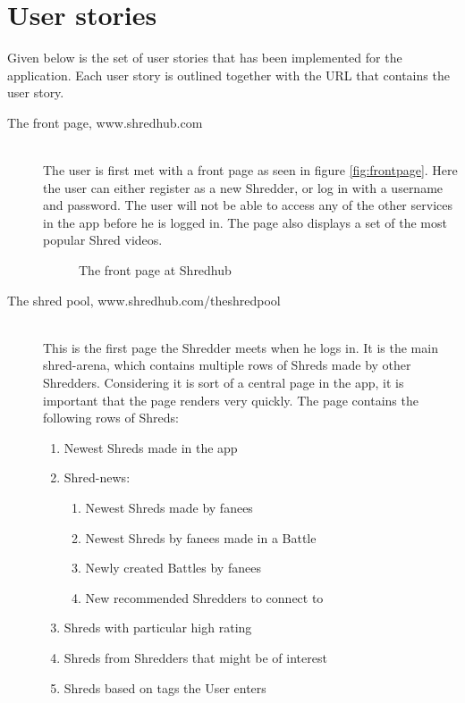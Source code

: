 \section{User stories}
Given below is the set of user stories that has been implemented for the application. Each user story is outlined together with the URL that contains the user story. 
\begin{description}
		
\item[The front page, www.shredhub.com] \hfill \\
The user is first met with a front page as seen in figure \vref{fig:frontpage}. Here the user can either register as a new Shredder, or log in with a username and password. The user will not be able to access any of the other services in the app before he is logged in. The page also displays a set of the most popular Shred videos.
\begin{figure}
 \begin{center}
\end{center}
\caption{The front page at Shredhub}\label{fig:frontpage}
\end{figure}

\item [The shred pool, www.shredhub.com/theshredpool] \hfill \\
This is the first page the Shredder meets when he logs in. It is the main shred-arena, which contains multiple rows of Shreds made by other Shredders. Considering it is sort of a central page in the app, it is important that the page renders very quickly. The page contains the following rows of Shreds:
\begin{enumerate}
\item{} Newest Shreds made in the app
\item{} Shred-news:
	\begin{enumerate}
		\item{} Newest Shreds made by fanees
		\item{} Newest Shreds by fanees made in a Battle
		\item{} Newly created Battles by fanees
		\item{} New recommended Shredders to connect to
	\end{enumerate}
\item{} Shreds with particular high rating
\item{} Shreds from Shredders that might be of interest
\item{} Shreds based on tags the User enters
\end{enumerate}


\end{description}
